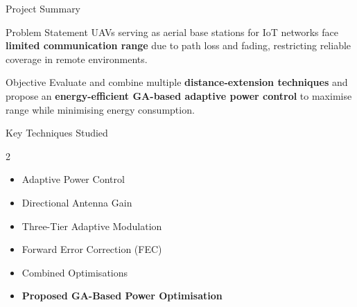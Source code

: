 \documentclass[aspectratio=169, 11pt]{beamer}
\begin{document}
\begin{frame}{Project Summary}
\begin{block}{Problem Statement}
UAVs serving as aerial base stations for IoT networks face \textbf{limited communication range} due to path loss and fading, restricting reliable coverage in remote environments.
\end{block}

\vspace{0.15cm}

\begin{block}{Objective}
Evaluate and combine multiple \textbf{distance-extension techniques} and propose an \textbf{energy-efficient GA-based adaptive power control} to maximise range while minimising energy consumption.
\end{block}

\vspace{0.15cm}

\begin{exampleblock}{Key Techniques Studied}
\begin{multicols}{2}
\begin{itemize}\setlength{\itemsep}{1pt}
  \item Adaptive Power Control
  \item Directional Antenna Gain
  \item Three-Tier Adaptive Modulation
  \item Forward Error Correction (FEC)
  \item Combined Optimisations
  \item \textbf{Proposed GA-Based Power Optimisation}
\end{itemize}
\end{multicols}
\end{exampleblock}
\end{frame}
\end{document}
